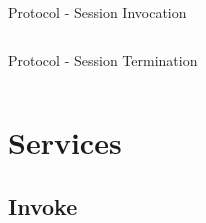 \documentclass[a4paper]{beamer}
\begin{document}
\begin{frame}{Protocol - Session Invocation}
    \begin{columns}[t]
        \begin{column}{0.44\textwidth}
            
        \end{column}
        \begin{column}{0.44\textwidth}
            
        \end{column}
    \end{columns}
\end{frame}

\begin{frame}{Protocol - Session Termination}
    \begin{columns}[t]
        \begin{column}{0.44\textwidth}
            
        \end{column}
        \begin{column}{0.44\textwidth}
        \end{column}
    \end{columns}
\end{frame}

\section{Services}

\subsection{Invoke}
\end{document}
